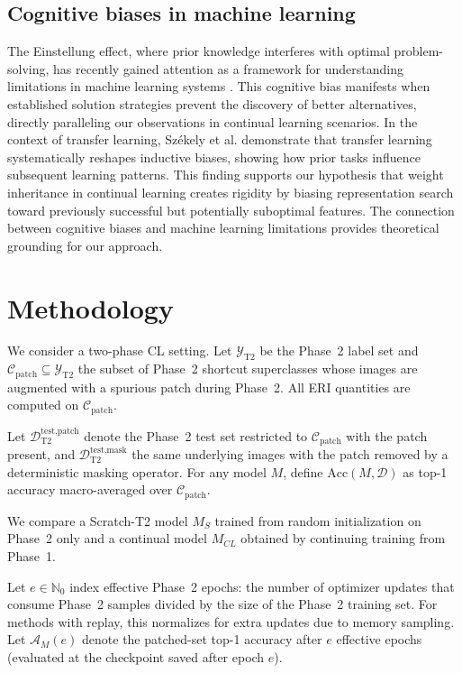 \documentclass[conference]{IEEEtran}
\begin{document}
\subsection{Cognitive biases in machine learning}
The Einstellung effect, where prior knowledge interferes with optimal problem-solving, has recently gained attention as a framework for understanding limitations in machine learning systems \cite{Binz2021ReconstructingTE}. This cognitive bias manifests when established solution strategies prevent the discovery of better alternatives, directly paralleling our observations in continual learning scenarios. In the context of transfer learning, Székely et al. \cite{10.1162/opmi_a_00158} demonstrate that transfer learning systematically reshapes inductive biases, showing how prior tasks influence subsequent learning patterns. This finding supports our hypothesis that weight inheritance in continual learning creates rigidity by biasing representation search toward previously successful but potentially suboptimal features. The connection between cognitive biases and machine learning limitations provides theoretical grounding for our approach. 

\section{Methodology}

We consider a two-phase CL setting. Let \(\mathcal{Y}_{\mathrm{T2}}\) be the Phase~2 label set and \(\mathcal{C}_{\text{patch}}\subseteq\mathcal{Y}_{\mathrm{T2}}\) the subset of Phase~2 shortcut superclasses whose images are augmented with a spurious patch during Phase~2. All ERI quantities are computed on \(\mathcal{C}_{\text{patch}}\).

Let \(\mathcal{D}_{\mathrm{T2}}^{\text{test,patch}}\) denote the Phase~2 test set restricted to \(\mathcal{C}_{\text{patch}}\) with the patch present, and \(\mathcal{D}_{\mathrm{T2}}^{\text{test,mask}}\) the same underlying images with the patch removed by a deterministic masking operator. For any model \(M\), define \(\mathrm{Acc}(M,\mathcal{D})\) as top-1 accuracy macro-averaged over \(\mathcal{C}_{\text{patch}}\).

We compare a Scratch-T2 model \(M_S\) trained from random initialization on Phase~2 only and a continual model \(M_{CL}\) obtained by continuing training from Phase~1. 

Let \(e\in\mathbb{N}_0\) index effective Phase~2 epochs: the number of optimizer updates that consume Phase~2 samples divided by the size of the Phase~2 training set. For methods with replay, this normalizes for extra updates due to memory sampling. Let \(\mathcal{A}_M(e)\) denote the patched-set top-1 accuracy after \(e\) effective epochs (evaluated at the checkpoint saved after epoch \(e\)).
\end{document}

